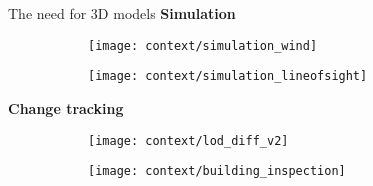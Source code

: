 \begin{frame}[t]{The need for 3D models}
	\scriptsize
	\textbf{Simulation}
	\begin{figure}
		\centering
		\begin{subfigure}[t]{0.3\linewidth}
			\texttt{[image: context/simulation\_wind]}
		\end{subfigure}
		\hspace{0.1\linewidth}
		\begin{subfigure}[t]{0.3\linewidth}
			\texttt{[image: context/simulation\_lineofsight]}
		\end{subfigure}
	\end{figure}

	\textbf{Change tracking}
	\begin{figure}
		\centering
		\begin{subfigure}[t]{0.3\linewidth}
			\texttt{[image: context/lod\_diff\_v2]}
		\end{subfigure}
		\hspace{0.1\linewidth}
		\begin{subfigure}[t]{0.3\linewidth}
			\texttt{[image: context/building\_inspection]}
		\end{subfigure}
	\end{figure}
\end{frame}

